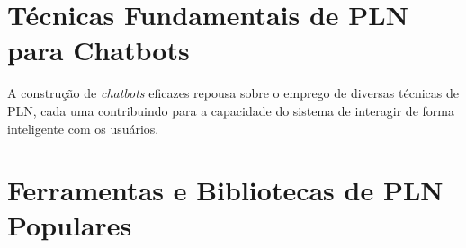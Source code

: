 \documentclass[14pt,a4paper,oneside]{book}
\begin{document}

\section{Técnicas Fundamentais de PLN para Chatbots}

A construção de \textit{chatbots} eficazes repousa sobre o emprego de diversas técnicas de PLN, cada uma contribuindo para a capacidade do sistema de interagir de forma inteligente com os usuários. 



\section{Ferramentas e Bibliotecas de PLN Populares}
\end{document}
